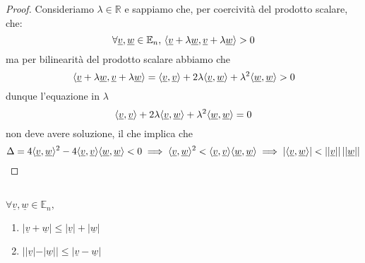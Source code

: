 \documentclass[openany, italian]{book}
\begin{document}
\begin{proof}
Consideriamo $\lambda \in \mathbb{R}$ e sappiamo che, per coercività del prodotto scalare, che:
$$
\forall \underline{v}, \underline{w} \in \mathbb{E}_n, \, \langle \underline{v} + \lambda \underline{w}, \underline{v} + \lambda \underline{w} \rangle > 0
$$
ma per bilinearità del prodotto scalare abbiamo che
$$
\langle \underline{v} + \lambda \underline{w}, \underline{v} + \lambda \underline{w} \rangle = \langle \underline{v}, \underline{v} \rangle + 2\lambda \langle \underline{v}, \underline{w} \rangle + \lambda^2 \langle \underline{w}, \underline{w} \rangle> 0
$$
dunque l'equazione in $\lambda$
$$
\langle \underline{v}, \underline{v} \rangle + 2\lambda \langle \underline{v}, \underline{w} \rangle + \lambda^2 \langle \underline{w}, \underline{w} \rangle = 0
$$
non deve avere soluzione, il che implica che
$$
\Delta = 4\langle \underline{v}, \underline{w} \rangle^2 - 4 \langle \underline{v}, \underline{v} \rangle \langle \underline{w}, \underline{w} \rangle < 0 \implies \langle \underline{v}, \underline{w} \rangle^2 < \langle \underline{v}, \underline{v} \rangle \langle \underline{w}, \underline{w} \rangle \implies |\langle \underline{v}, \underline{w} \rangle| < ||\underline{v}|| \, ||\underline{w}||
$$
\end{proof}
\begin{prop} \hfill \\
$ \forall \underline{v}, \underline{w} \in \mathbb{E}_n, $
\begin{enumerate}[label=\protect\circled{\arabic*}]
	\item $|\underline{v} + \underline{w}| \leq |\underline{v}| + |\underline{w}|$
	\item $||\underline{v}| - |\underline{w}|| \leq |\underline{v} - \underline{w}|$
\end{enumerate}
\label{prop:dis_triang}
\end{prop}
\end{document}
